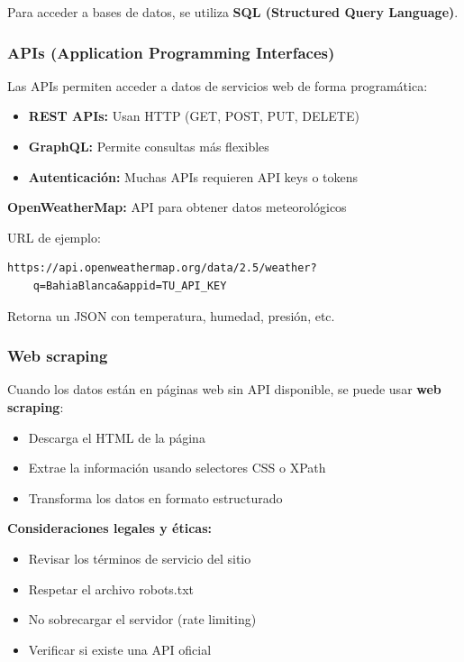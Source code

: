 \documentclass[a4paper,11pt]{article}
\begin{document}
Para acceder a bases de datos, se utiliza \textbf{SQL (Structured Query Language)}.

\subsubsection{APIs (Application Programming Interfaces)}

Las APIs permiten acceder a datos de servicios web de forma programática:

\begin{itemize}
    \item \textbf{REST APIs:} Usan HTTP (GET, POST, PUT, DELETE)
    \item \textbf{GraphQL:} Permite consultas más flexibles
    \item \textbf{Autenticación:} Muchas APIs requieren API keys o tokens
\end{itemize}

\begin{tcolorbox}[colback=ejemplocolor!20, colframe=unidadcolor, title=Ejemplo de API pública]
\textbf{OpenWeatherMap:} API para obtener datos meteorológicos

URL de ejemplo:
\begin{verbatim}
https://api.openweathermap.org/data/2.5/weather?
    q=BahiaBlanca&appid=TU_API_KEY
\end{verbatim}

Retorna un JSON con temperatura, humedad, presión, etc.
\end{tcolorbox}

\subsubsection{Web scraping}

Cuando los datos están en páginas web sin API disponible, se puede usar \textbf{web scraping}:

\begin{itemize}
    \item Descarga el HTML de la página
    \item Extrae la información usando selectores CSS o XPath
    \item Transforma los datos en formato estructurado
\end{itemize}

\begin{tcolorbox}[colback=advertenciacolor!20, colframe=red, title=Advertencia sobre web scraping]
\textbf{Consideraciones legales y éticas:}
\begin{itemize}
    \item Revisar los términos de servicio del sitio
    \item Respetar el archivo robots.txt
    \item No sobrecargar el servidor (rate limiting)
    \item Verificar si existe una API oficial
\end{itemize}
\end{tcolorbox}
\end{document}
